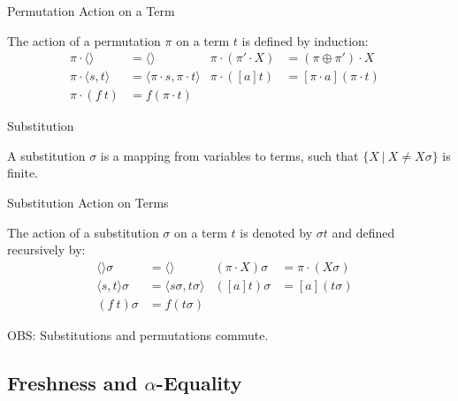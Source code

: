 \begin{frame}{Permutation Action on a Term}
    \begin{definition}
    The action of a permutation $\pi$ on a term $t$ is defined by induction:
    \begin{align*}
        \pi \cdot  \langle \rangle &= \langle \rangle & 
        \pi \cdot (\pi' \cdot X) &= (\pi \oplus \pi') \cdot X & 
        \\ 
        \pi \cdot \langle s, t \rangle &= \langle \pi \cdot s, \pi \cdot t \rangle  & 
        \pi \cdot ([a]t) &= [\pi \cdot a](\pi \cdot t) & 
        \\
        \pi \cdot (f \ t) &= f(\pi \cdot t) 
    \end{align*}
    \end{definition}
\end{frame}

\begin{frame}{Substitution}
    \begin{definition}[Substitution]
    A substitution $\sigma$ is a mapping from variables to terms, such that
    $\{X \ | \ X \neq X\sigma \}$ is finite.
    \end{definition}
\end{frame}

\begin{frame}{Substitution Action on Terms}
    \begin{definition}    
        The action of a substitution $\sigma$ on a term $t$ is denoted by $\sigma t$ and
        defined recursively by: 
    \begin{align*}
        \langle \rangle \sigma &= \langle \rangle & 
        (\pi \cdot X) \sigma &= \pi \cdot (X \sigma)  & 
        \\ 
        \langle s, t \rangle \sigma &= \langle  s \sigma, t \sigma \rangle  & 
        ([a]t) \sigma &= [a](t \sigma) & 
        \\
        (f \ t) \sigma &= f (t \sigma) 
    \end{align*}
    
    OBS: Substitutions and permutations commute. 
    \end{definition}
\end{frame}

\subsection{Freshness and $\alpha$-Equality}

